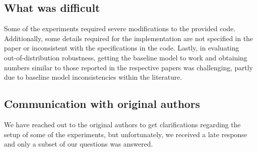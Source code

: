 \subsection*{What was difficult}
Some of the experiments required severe modifications to the provided code. Additionally, some details required for the implementation are not specified in the paper or inconsistent with the specifications in the code. Lastly, in evaluating out-of-distribution robustness, getting the baseline model to work and obtaining numbers similar to those reported in the respective papers was challenging, partly due to baseline model inconsistencies within the literature.


\subsection*{Communication with original authors}
We have reached out to the original authors to get clarifications regarding the setup of some of the experiments, but unfortunately, we received a late response and only a subset of our questions was answered.
